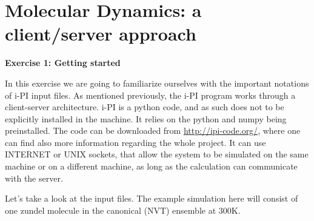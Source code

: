 \documentclass[a4paper,11pt]{scrartcl}
\def\td{\$HandsOn/tutorial\_4}
\begin{document}



\newpage
\section*{Molecular Dynamics: a client/server approach}

{\large\textbf{Exercise 1: Getting started}}

In this exercise we are going to familiarize ourselves with the important notations of
i-PI input files. As mentioned previously, the i-PI program works through a client-server architecture.
i-PI is a python code, and as such does not to be explicitly installed in the machine. It relies on
the python and numpy being preinstalled. The code can be downloaded from \href{http://ipi-code.org/}{http://ipi-code.org/}, where one can find
also more information regarding the whole project.
It can use INTERNET or UNIX sockets, that allow the system to be simulated
on the same machine or on a different machine, as long as the calculation can communicate with the server.


 Let's take a look at the input files.
The example simulation here will consist of one zundel molecule in the canonical (NVT) ensemble at 300K.
\end{document}
